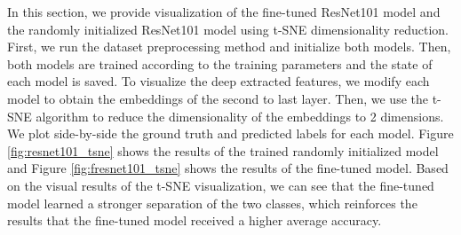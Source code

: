 \documentclass{aci}
\numberwithin{equation}{section}
\begin{document}
In this section, we provide visualization of the fine-tuned ResNet101 model and
the randomly initialized ResNet101 model using t-SNE dimensionality reduction.
First, we run the dataset preprocessing method and initialize both models. Then,
both models are trained according to the training parameters and the state of
each model is saved. To visualize the deep extracted features, we modify each
model to obtain the embeddings of the second to last layer. Then, we use the
t-SNE algorithm to reduce the dimensionality of the embeddings to 2 dimensions.
We plot side-by-side the ground truth and predicted labels for each model.
Figure \ref{fig:resnet101_tsne} shows the results of the trained randomly
initialized model and Figure \ref{fig:fresnet101_tsne} shows the results of the
fine-tuned model. Based on the visual results of the t-SNE visualization, we can see that the
fine-tuned model learned a stronger separation of the two classes, which
reinforces the results that the fine-tuned model received a higher average
accuracy.
\end{document}
